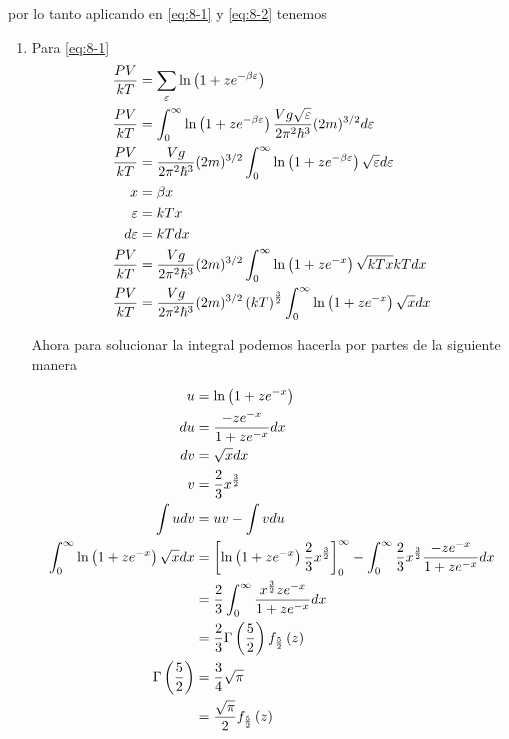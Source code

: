 \documentclass{report}
\begin{document}
por lo tanto aplicando en \ref{eq:8-1} y \ref{eq:8-2} tenemos
\begin{enumerate}
  \item Para \ref{eq:8-1}
    \begin{align*}
      \frac{PV}{kT} &= \sum_{\varepsilon}\ln\left(1 + ze^{-\beta\varepsilon}\right)\\
      \frac{PV}{kT} &= \int_0^\infty \ln\left(1 + ze^{-\beta\varepsilon}\right)\frac{V g \sqrt{\varepsilon}}{2\pi^2 \hbar^3} (2m)^{3/2} d\varepsilon\\
      \frac{PV}{kT} &= \frac{V g }{2\pi^2 \hbar^3} (2m)^{3/2}\int_0^\infty \ln\left(1 + ze^{-\beta\varepsilon}\right) \sqrt{\varepsilon}d\varepsilon\\
      x &= \beta x\\
      \varepsilon &= kTx\\
      d\varepsilon &= kTdx\\
      \frac{PV}{kT} &= \frac{V g }{2\pi^2 \hbar^3} (2m)^{3/2}\int_0^\infty \ln\left(1 + ze^{-x}\right) \sqrt{kTx}kTdx\\
      \frac{PV}{kT}&=\frac{V g }{2\pi^2 \hbar^3} (2m)^{3/2} \left(kT\right)^{\frac{3}{2}}\int_0^\infty \ln\left(1 + ze^{-x}\right)\sqrt{x}dx
    \end{align*}

    Ahora para solucionar la integral podemos hacerla por partes de la siguiente manera

    \begin{align*}
      u &= \ln\left(1 + ze^{-x}\right)\\
      du &= \frac{-ze^{-x}}{1 + ze^{-x}}dx\\
      dv &= \sqrt{x}dx\\
      v &= \frac{2}{3}x^{\frac{3}{2}}\\
      \int udv &= uv - \int vdu\\
      \int_0^\infty \ln\left(1 + ze^{-x}\right)\sqrt{x}dx &= \left[\ln\left(1 + ze^{-x}\right)\frac{2}{3}x^{\frac{3}{2}}\right]_{0}^\infty - \int_0^\infty \frac{2}{3}x^{\frac{3}{2}}\frac{-ze^{-x}}{1 + ze^{-x}}dx\\
      &=  \frac{2}{3}\int_0^\infty \frac{x^{\frac{3}{2}}ze^{-x}}{1 + ze^{-x}}dx\\
      &=  \frac{2}{3}\Gamma\left(\frac{5}{2}\right)f_{\frac{5}{2}}\left(z\right)\\
      \Gamma\left(\frac{5}{2}\right) &= \frac{3}{4}\sqrt{\pi}\\
      &=  \frac{\sqrt{\pi}}{2}f_{\frac{5}{2}}\left(z\right)
    \end{align*}


\end{enumerate}
\end{document}
